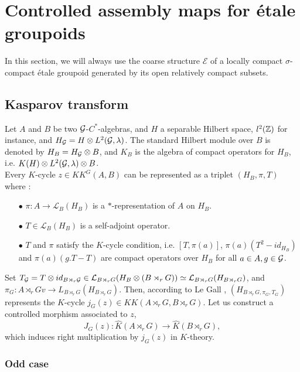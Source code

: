 \section{Controlled assembly maps for étale groupoids}

In this section, we will always use the coarse structure $\mathcal E$ of a locally compact $\sigma$-compact étale groupoid generated by its open relatively compact subsets.

\subsection{Kasparov transform}

Let $A$ and $B$ be two $\mathcal G$-$C^*$-algebras, and $H$ a separable Hilbert space, $l^2(\mathbb Z)$ for instance, and $H_\mathcal G= H\otimes L^2(\mathcal G,\lambda)$. The standard Hilbert module over $B$ is denoted by $H_B=H_\mathcal G\otimes B$, and $K_B$ is the algebra of compact operators for $H_B$, i.e. $K(H)\otimes L^2(\mathcal G,\lambda)\otimes B$. \\

Every $K$-cycle $z\in KK^G(A,B)$ can be represented as a triplet $(H_B, \pi, T)$ where :
\begin{itemize}
\item[$\bullet$]$\pi : A\rightarrow \mathcal L_B(H_B)$ is a $*$-representation of $A$ on $H_B$.
\item[$\bullet$]$T\in \mathcal L_B(H_B)$ is a self-adjoint operator.
\item[$\bullet$] $T$ and $\pi$ satisfy the $K$-cycle condition, i.e. $[T,\pi(a)]$, $\pi(a)(T^2-id_{H_B})$ and $\pi(a)(g.T-T)$ are compact operators over $H_B$ for all $a\in A, g\in \mathcal G$.\\
\end{itemize}

Set $T_\mathcal G= T\otimes id_{B\rtimes_r \mathcal G}\in \mathcal L_{B\rtimes_r G}(H_B\otimes (B\rtimes_r G))\simeq \mathcal L_{B\rtimes_r G}(H_{B\rtimes_r G})$, and $\pi_G: A\rtimes_r G v\rightarrow L_{B\rtimes_r G}(H_{B\rtimes_r G})$. Then, according to Le Gall \cite{LeGall}, $(H_{B\rtimes_r G, \pi_G, T_G})$ represents the $K$-cycle $j_G(z)\in KK(A\rtimes_r G,B\rtimes_r G)$. Let us construct a controlled morphism associated to $z$,
\[J_G(z) : \hat K(A\rtimes_r G)\rightarrow \hat K(B\rtimes_r G), \]
which induces right multiplication by $j_G(z)$ in $K$-theory.\\

\subsubsection{Odd case}

